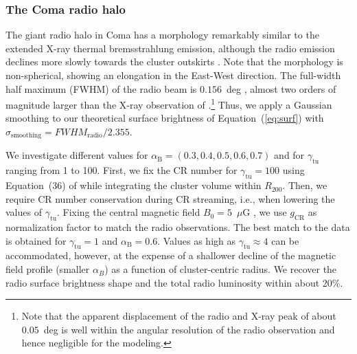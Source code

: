 \documentclass[traditabstract]{aa}
\newcommand{\rmn}{\mathrm}
\begin{document}
\subsubsection{The Coma radio halo}

The giant radio halo in Coma has a morphology remarkably similar to the extended
X-ray thermal bremsstrahlung emission, although the radio emission declines more
slowly towards the cluster outskirts
\citep{1992A&A...259L..31B,1997A&A...321...55D}. Note that the morphology is
non-spherical, showing an elongation in the East-West direction.  The full-width
half maximum (FWHM) of the radio beam is $0.156$~deg
\citep{1997A&A...321...55D}, almost two orders of magnitude larger than the
X-ray observation of \cite{1992A&A...259L..31B}.\footnote{Note that the apparent
  displacement of the radio and X-ray peak of about $0.05$~deg is well
  within the angular resolution of the radio observation and hence negligible
  for the modeling.}  Thus, we apply a Gaussian smoothing to our theoretical
surface brightness of Equation~(\ref{eq:surf}) with $\sigma_{\rmn{smoothing}} =
FWHM_{\rmn{radio}}/2.355$.

We investigate different values for $\alpha_{\rmn{B}}=(0.3,0.4,0.5,0.6,0.7)$ and
for $\gamma_{\rmn{tu}}$ ranging from 1 to 100. First, we fix the CR number for
$\gamma_{\rmn{tu}}=100$ using Equation~(36) of \cite{2011A&A...527A..99E} while
integrating the cluster volume within $R_{200}$. Then, we require CR number
conservation during CR streaming, i.e., when lowering the values of
$\gamma_{\rmn{tu}}$. Fixing the central magnetic field $B_{0}=5$~$\mu$G
\citep{2010A&A...513A..30B}, we use $g_{\rmn{CR}}$ as normalization factor to
match the radio observations. The best match to the data is obtained for
$\gamma_{\rmn{tu}}=1$ and $\alpha_{\rmn{B}}=0.6$. Values as high as
$\gamma_{\rmn{tu}} \approx 4$ can be accommodated, however, at the expense 
of a shallower decline of the magnetic field profile (smaller $\alpha_B$) as a
function of cluster-centric radius. We recover the radio surface brightness
shape and the total radio luminosity within about $20\%$. 
\end{document}
